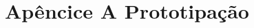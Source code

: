 \documentclass[
	12pt,				%
	openright,			%
	oneside,			%
	a4paper,			%
	english,			%
	brazil,				%
	]{abntex2}
\theoremstyle{theorem}
\theoremstyle{definition}
\begin{document}
\frenchspacing 


 \pagestyle{simple}





\textual








\postextual




\chapter{Apêncice A Prototipação}
\label{sec:apendice}

\end{document}
